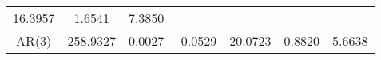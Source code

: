 \documentclass{article}
\begin{document}
\begin{longtable}[c]{@{}ccccccc@{}}
\begin{minipage}[t]{0.12\columnwidth}
16.3957
\strut\end{minipage} &
\begin{minipage}[t]{0.11\columnwidth}\centering\strut
1.6541
\strut\end{minipage} &
\begin{minipage}[t]{0.13\columnwidth}\centering\strut
7.3850
\strut\end{minipage}\tabularnewline
\begin{minipage}[t]{0.11\columnwidth}\centering\strut
AR(3)
\strut\end{minipage} &
\begin{minipage}[t]{0.12\columnwidth}\centering\strut
258.9327
\strut\end{minipage} &
\begin{minipage}[t]{0.13\columnwidth}\centering\strut
0.0027
\strut\end{minipage} &
\begin{minipage}[t]{0.11\columnwidth}\centering\strut
-0.0529
\strut\end{minipage} &
\begin{minipage}[t]{0.12\columnwidth}\centering\strut
20.0723
\strut\end{minipage} &
\begin{minipage}[t]{0.11\columnwidth}\centering\strut
0.8820
\strut\end{minipage} &
\begin{minipage}[t]{0.13\columnwidth}\centering\strut
5.6638
\strut\end{minipage}\tabularnewline
\bottomrule
\end{longtable}
\end{document}
